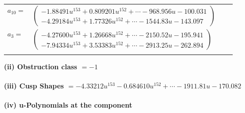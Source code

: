 \documentclass[1p]{elsarticle_modified}
\theoremstyle{definition}
\begin{document}
\begin{tabular}{m{7pt} m{180pt} m{7pt} m{180pt} }
\flushright $a_{10}=$&$\begin{pmatrix}-1.88491 u^{153}+0.809201 u^{152}+\cdots-968.956 u-100.031\\-4.29184 u^{153}+1.77326 u^{152}+\cdots-1544.83 u-143.097\end{pmatrix}$ \\
\flushright $a_{3}=$&$\begin{pmatrix}-4.27600 u^{153}+1.26668 u^{152}+\cdots-2150.52 u-195.941\\-7.94334 u^{153}+3.53383 u^{152}+\cdots-2913.25 u-262.894\end{pmatrix}$\\&\end{tabular}
\flushleft \textbf{(ii) Obstruction class $= -1$}\\~\\
\flushleft \textbf{(iii) Cusp Shapes $= -4.33212 u^{153}-0.684610 u^{152}+\cdots-1911.81 u-170.082$}\\~\\
\newpage\renewcommand{\arraystretch}{1}
\flushleft \textbf{(iv) u-Polynomials at the component}\newline \\
\end{document}
